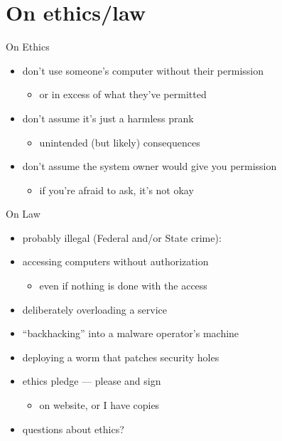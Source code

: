 \section{On ethics/law}

\begin{frame}{On Ethics}
    \begin{itemize}
    \item don't use someone's computer without their permission
        \begin{itemize}
        \item or in excess of what they've permitted
        \end{itemize}
    \item don't assume it's just a harmless prank
        \begin{itemize}
        \item unintended (but likely) consequences
        \end{itemize}
    \item don't assume the system owner would give you permission
        \begin{itemize}
        \item if you're afraid to ask, it's not okay
        \end{itemize}
    \end{itemize}
\end{frame}

\begin{frame}{On Law}
    \begin{itemize}
    \item probably illegal (Federal and/or State crime):
    \vspace{.5cm}
    \item accessing computers without authorization
        \begin{itemize}
        \item even if nothing is done with the access
        \end{itemize}
    \item deliberately overloading a service
    \item ``backhacking'' into a malware operator's machine
    \item deploying a worm that patches security holes
    \end{itemize}
\end{frame}

\begin{frame}
    \begin{itemize}
    \item ethics pledge --- please  and sign
        \begin{itemize}
        \item on website, or I have copies
        \end{itemize}
    \item questions about ethics?
    \end{itemize}
\end{frame}

